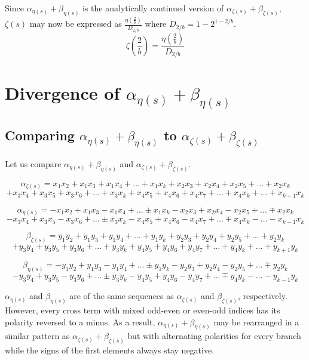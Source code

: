 \documentclass{amsart}
\begin{document}
	Since $\alpha_{\eta(s)} + \beta_{\eta(s)}$ is the analytically continued version of $\alpha_{\zeta(s)} + \beta_{\zeta(s)}$, $\zeta(s)$ may now be expressed as $\frac{\eta( \frac{2}{b} )}{D_{2/b}}$ where $D_{2/b} = 1 - 2^{1-{2/b}}$.
	\[ \zeta(\frac{2}{b}) = \frac{\eta( \frac{2}{b} )}{D_{2/b}} \]
	
	\section{Divergence of $\alpha_{\eta(s)} + \beta_{\eta(s)}$}
	\subsection{Comparing $\alpha_{\eta(s)} + \beta_{\eta(s)}$ to $\alpha_{\zeta(s)} + \beta_{\zeta(s)}$}
	Let us compare $\alpha_{\eta(s)} + \beta_{\eta(s)}$ and $\alpha_{\zeta(s)} + \beta_{\zeta(s)}$.
	
	\[ \alpha_{\zeta(s)} = x_1x_2 + x_1x_3 + x_1x_4 + \dots + x_{1}x_{k} +x_2x_3 + x_2x_4 + x_2x_5 + \dots + x_{2}x_{k} \]
	\[ +x_3x_4 + x_3x_5 + x_3x_6 + \dots + x_{3}x_{k} +x_4x_5 + x_4x_6 + x_4x_7 + \dots + x_{4}x_{k} + \dots + x_{k+1}x_{k} \]
	
	\[ \alpha_{\eta(s)} = -x_1x_2 + x_1x_3 - x_1x_4 + \dots \pm x_{1}x_{k} -x_2x_3 + x_2x_4 - x_2x_5 + \dots \mp x_{2}x_{k} \]
	\[ -x_3x_4 + x_3x_5 - x_3x_6 + \dots \pm x_{3}x_{k} -x_4x_5 + x_4x_6 - x_4x_7 + \dots \mp x_{4}x_{k} - \dots - x_{k-1}x_{k} \]
	
	\[ \beta_{\zeta(s)} = y_1y_2 + y_1y_3 + y_1y_4 + \dots + y_{1}y_{k} +y_2y_3 + y_2y_4 + y_2y_5 + \dots + y_{2}y_{k} \]
	\[ +y_3y_4 + y_3y_5 + y_3y_6 + \dots + y_{3}y_{k} +y_4y_5 + y_4y_6 + y_4y_7 + \dots + y_{4}y_{k} + \dots + y_{k+1}y_{k} \]
	
	\[ \beta_{\eta(s)} = -y_1y_2 + y_1y_3 - y_1y_4 + \dots \pm y_{1}y_{k} -y_2y_3 + y_2y_4 - y_2y_5 + \dots \mp y_{2}y_{k} \]
	\[ -y_3y_4 + y_3y_5 - y_3y_6 + \dots \pm y_{3}y_{k} -y_4y_5 + y_4y_6 - y_4y_7 + \dots \mp y_{4}y_{k} - \dots - y_{k-1}y_{k} \]
	\[\]
	
	$\alpha_{\eta(s)}$ and $\beta_{\eta(s)}$ are of the same sequences as $\alpha_{\zeta(s)}$ and $\beta_{\zeta(s)}$, respectively. However, every cross term with mixed odd-even or even-odd indices has its polarity reversed to a minus. As a result, $\alpha_{\eta(s)} + \beta_{\eta(s)}$ may be rearranged in a similar pattern as $\alpha_{\zeta(s)} + \beta_{\zeta(s)}$ but with alternating polarities for every branch while the signs of the first elements always stay negative.
	
\end{document}
